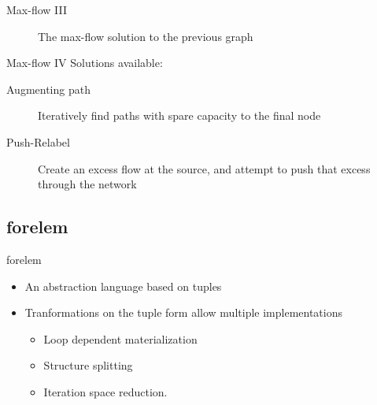 \documentclass{beamer}
\begin{document}
\begin{frame}{Max-flow III}
	\begin{figure}[h]
\centering
{}
\caption{The max-flow solution to the previous graph}
\end{figure}
\end{frame}

\begin{frame}{Max-flow IV}
	Solutions available:
	\begin{description}
		\item[Augmenting path] Iteratively find paths with spare capacity to the final node
		\item[Push-Relabel] Create an excess flow at the source, and attempt to push that excess through the network
	\end{description}
\end{frame}

\subsection{forelem}

\begin{frame}{forelem}
	\begin{itemize}
		\item An abstraction language based on tuples
		\item Tranformations on the tuple form allow multiple implementations
			\begin{itemize}
				\item Loop dependent materialization
				\item Structure splitting
				\item Iteration space reduction.
			\end{itemize}
	\end{itemize}
\end{frame}
\end{document}
